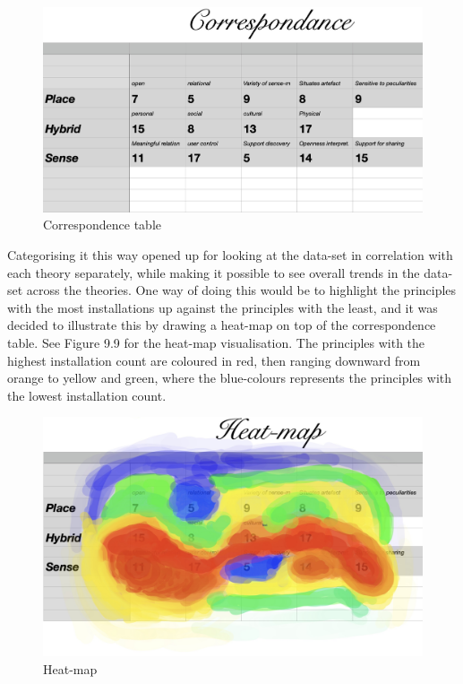 \begin{figure}[H]
\includegraphics[width=13cm]{pictures/analysis/correspondance.jpeg}
\caption{Correspondence table}
\centering 
\end{figure}

Categorising it this way opened up for looking at the data-set in correlation with each theory separately, while making it possible to see overall trends in the data-set across the theories. One way of doing this would be to highlight the principles with the most installations up against the principles with the least, and it was decided to illustrate this by drawing a heat-map on top of the correspondence table. See Figure 9.9 for the heat-map visualisation. The principles with the highest installation count are coloured in red, then ranging downward from orange to yellow and green, where the blue-colours represents the principles with the lowest installation count.

\begin{figure}[H]
\includegraphics[width=13cm]{pictures/analysis/heatmap.jpeg}
\caption{Heat-map}
\centering 
\end{figure}

